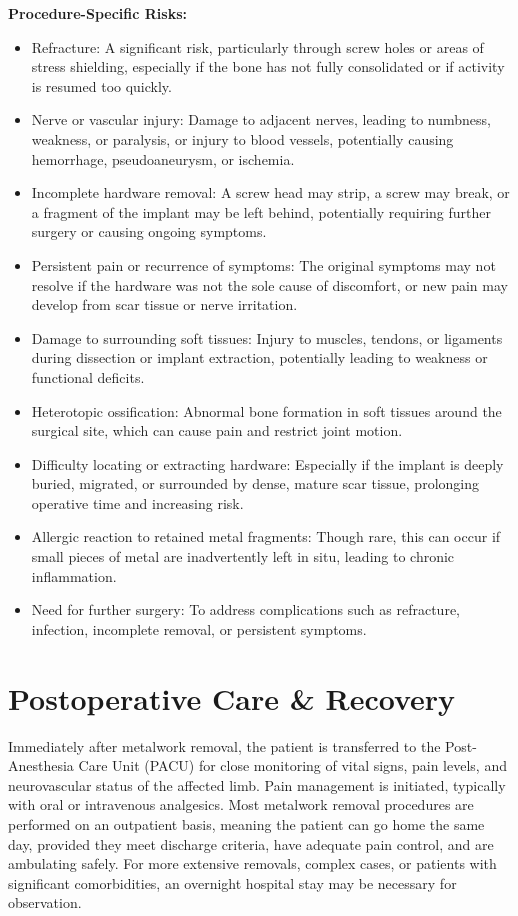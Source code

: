 \textbf{Procedure-Specific Risks:}
\begin{itemize}
  \item Refracture: A significant risk, particularly through screw holes or areas of stress shielding, especially if the bone has not fully consolidated or if activity is resumed too quickly.
  \item Nerve or vascular injury: Damage to adjacent nerves, leading to numbness, weakness, or paralysis, or injury to blood vessels, potentially causing hemorrhage, pseudoaneurysm, or ischemia.
  \item Incomplete hardware removal: A screw head may strip, a screw may break, or a fragment of the implant may be left behind, potentially requiring further surgery or causing ongoing symptoms.
  \item Persistent pain or recurrence of symptoms: The original symptoms may not resolve if the hardware was not the sole cause of discomfort, or new pain may develop from scar tissue or nerve irritation.
  \item Damage to surrounding soft tissues: Injury to muscles, tendons, or ligaments during dissection or implant extraction, potentially leading to weakness or functional deficits.
  \item Heterotopic ossification: Abnormal bone formation in soft tissues around the surgical site, which can cause pain and restrict joint motion.
  \item Difficulty locating or extracting hardware: Especially if the implant is deeply buried, migrated, or surrounded by dense, mature scar tissue, prolonging operative time and increasing risk.
  \item Allergic reaction to retained metal fragments: Though rare, this can occur if small pieces of metal are inadvertently left in situ, leading to chronic inflammation.
  \item Need for further surgery: To address complications such as refracture, infection, incomplete removal, or persistent symptoms.
\end{itemize}

\section*{Postoperative Care \& Recovery}
Immediately after metalwork removal, the patient is transferred to the Post-Anesthesia Care Unit (PACU) for close monitoring of vital signs, pain levels, and neurovascular status of the affected limb. Pain management is initiated, typically with oral or intravenous analgesics. Most metalwork removal procedures are performed on an outpatient basis, meaning the patient can go home the same day, provided they meet discharge criteria, have adequate pain control, and are ambulating safely. For more extensive removals, complex cases, or patients with significant comorbidities, an overnight hospital stay may be necessary for observation.

